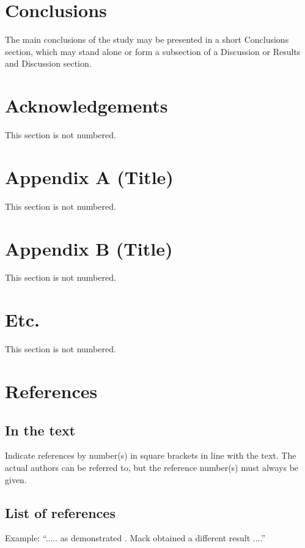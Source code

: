 \section{Conclusions}
The main conclusions of the study may be presented in a short Conclusions section, which may stand alone or form a subsection of a Discussion or Results and Discussion section.

\section*{Acknowledgements}
This section is not numbered.

\section*{Appendix A (Title)}
This section is not numbered.

\section*{Appendix B (Title)}
This section is not numbered.

\section*{Etc.}
This section is not numbered.

\section*{References}
\subsection*{In the text}
Indicate references by number(s) in square brackets in line with the text. The actual authors can be referred to, but the reference number(s) must always be given.

\subsection*{List of references}
Example: “..... as demonstrated \cite{geer2010art,chang2015space,strunk2000elements,mettam2009prepare}. Mack \cite{mack2015virgin} obtained a different result ....”

\printbibliography[heading=none]

